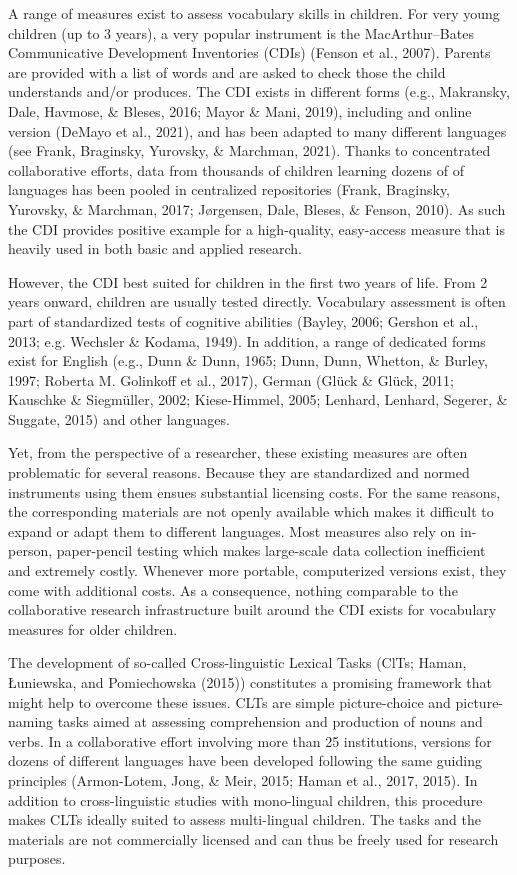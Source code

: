 \documentclass[
  man,floatsintext]{apa6}
\begin{document}
A range of measures exist to assess vocabulary skills in children. For very young children (up to 3 years), a very popular instrument is the MacArthur--Bates Communicative Development Inventories (CDIs) (Fenson et al., 2007). Parents are provided with a list of words and are asked to check those the child understands and/or produces. The CDI exists in different forms (e.g., Makransky, Dale, Havmose, \& Bleses, 2016; Mayor \& Mani, 2019), including and online version (DeMayo et al., 2021), and has been adapted to many different languages (see Frank, Braginsky, Yurovsky, \& Marchman, 2021). Thanks to concentrated collaborative efforts, data from thousands of children learning dozens of of languages has been pooled in centralized repositories (Frank, Braginsky, Yurovsky, \& Marchman, 2017; Jørgensen, Dale, Bleses, \& Fenson, 2010). As such the CDI provides positive example for a high-quality, easy-access measure that is heavily used in both basic and applied research.

However, the CDI best suited for children in the first two years of life. From 2 years onward, children are usually tested directly. Vocabulary assessment is often part of standardized tests of cognitive abilities (Bayley, 2006; Gershon et al., 2013; e.g. Wechsler \& Kodama, 1949). In addition, a range of dedicated forms exist for English (e.g., Dunn \& Dunn, 1965; Dunn, Dunn, Whetton, \& Burley, 1997; Roberta M. Golinkoff et al., 2017), German (Glück \& Glück, 2011; Kauschke \& Siegmüller, 2002; Kiese-Himmel, 2005; Lenhard, Lenhard, Segerer, \& Suggate, 2015) and other languages.

Yet, from the perspective of a researcher, these existing measures are often problematic for several reasons. Because they are standardized and normed instruments using them ensues substantial licensing costs. For the same reasons, the corresponding materials are not openly available which makes it difficult to expand or adapt them to different languages. Most measures also rely on in-person, paper-pencil testing which makes large-scale data collection inefficient and extremely costly. Whenever more portable, computerized versions exist, they come with additional costs. As a consequence, nothing comparable to the collaborative research infrastructure built around the CDI exists for vocabulary measures for older children.

The development of so-called Cross-linguistic Lexical Tasks (ClTs; Haman, Łuniewska, and Pomiechowska (2015)) constitutes a promising framework that might help to overcome these issues. CLTs are simple picture-choice and picture-naming tasks aimed at assessing comprehension and production of nouns and verbs. In a collaborative effort involving more than 25 institutions, versions for dozens of different languages have been developed following the same guiding principles (Armon-Lotem, Jong, \& Meir, 2015; Haman et al., 2017, 2015). In addition to cross-linguistic studies with mono-lingual children, this procedure makes CLTs ideally suited to assess multi-lingual children. The tasks and the materials are not commercially licensed and can thus be freely used for research purposes.
\end{document}
